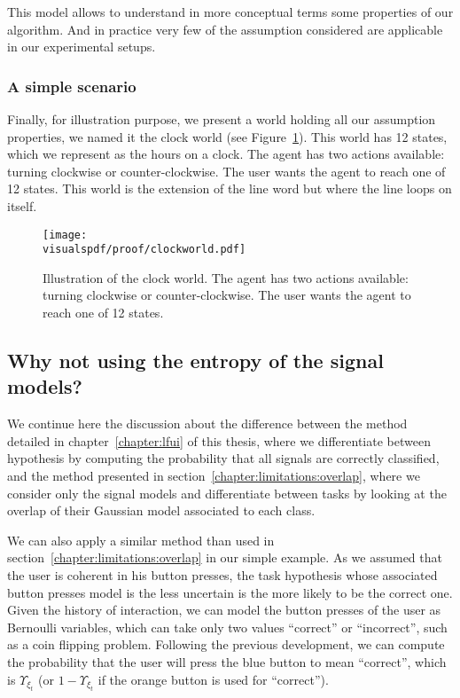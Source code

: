 This model allows to understand in more conceptual terms some properties of our algorithm. And in practice very few of the assumption considered are applicable in our experimental setups.

\newpage

\subsubsection*{A simple scenario}

Finally, for illustration purpose, we present a world holding all our assumption properties, we named it the clock world (see Figure~\ref{fig:clockworld}). This world has 12 states, which we represent as the hours on a clock. The agent has two actions available: turning clockwise or counter-clockwise. The user wants the agent to reach one of 12 states. This world is the extension of the line word but where the line loops on itself.

\begin{figure}[!htbp]
\centering
\texttt{[image: \\visualspdf/proof/clockworld.pdf]}
\caption{Illustration of the clock world. The agent has two actions available: turning clockwise or counter-clockwise. The user wants the agent to reach one of 12 states.}
\label{fig:clockworld}
\end{figure} 

\subsection{Why not using the entropy of the signal models?}

We continue here the discussion about the difference between the method detailed in chapter~\ref{chapter:lfui} of this thesis, where we differentiate between hypothesis by computing the probability that all signals are correctly classified, and the method presented in section~\ref{chapter:limitations:overlap}, where we consider only the signal models and differentiate between tasks by looking at the overlap of their Gaussian model associated to each class.


We can also apply a similar method than used in section~\ref{chapter:limitations:overlap} in our simple example. As we assumed that the user is coherent in his button presses, the task hypothesis whose associated button presses model is the less uncertain is the more likely to be the correct one. Given the history of interaction, we can model the button presses of the user as Bernoulli variables, which can take only two values ``correct'' or ``incorrect'', such as a coin flipping problem. Following the previous development, we can compute the probability that the user will press the blue button to mean ``correct'', which is $\Upsilon_{\xi_t}$ (or $1-\Upsilon_{\xi_t}$ if the orange button is used for ``correct'').

